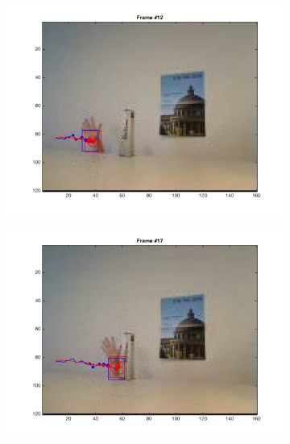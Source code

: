\documentclass{ethz_report}
\begin{document}
\begin{figure}[h]
    \begin{subfigure}[b]{.25\textwidth}
        \centering
        \includegraphics[width=1\linewidth]{images/video2__11}
    \end{subfigure}%
    \begin{subfigure}[b]{.25\textwidth}
        \centering
        \includegraphics[width=1\linewidth]{images/video2__16}
    \end{subfigure}
    \begin{subfigure}[b]{.25\textwidth}
        \centering

\end{subfigure}
\end{figure}
\end{document}
